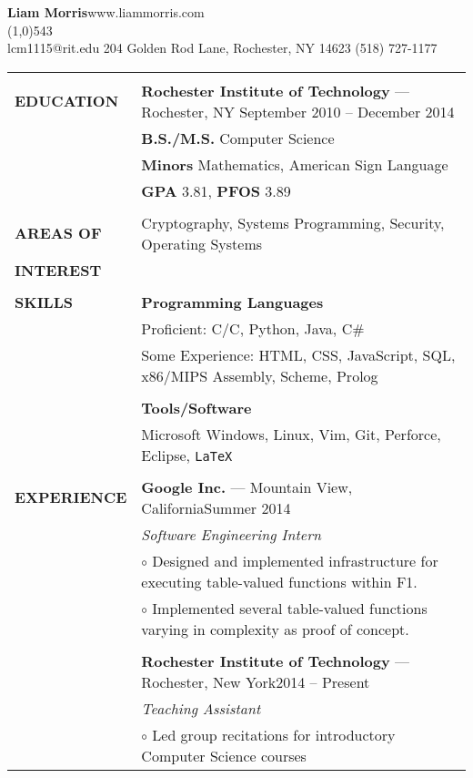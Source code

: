 \documentclass[10pt,letterpaper]{article}
\newcommand{\CPP}{C\nolinebreak[4]\hspace{-.05em}\raisebox{.22ex}{\footnotesize\bf ++}}
\newcommand{\circbullet}{\hspace{10pt}$\circ$ }
\begin{document}
\raggedright

\textbf{\huge{Liam Morris}}\hfill www.liammorris.com\\
\vspace{-8pt}
\line(1,0){543}\\
lcm1115@rit.edu \hfill 204 Golden Rod Lane, Rochester, NY 14623 \hfill (518) 727-1177\\
\vspace{5pt}

\begin{tabular}{@{}lp{6.6in}}
&\\
\textbf{EDUCATION}
&\textbf{Rochester Institute of Technology} --- Rochester, NY \hfill September 2010 -- December 2014\\
&\textbf{B.S./M.S.} Computer Science\\
&\textbf{Minors} Mathematics, American Sign Language\\
&\textbf{GPA} 3.81, \textbf{PFOS} 3.89\\
&\\
\textbf{AREAS OF}
&Cryptography, Systems Programming, Security, Operating Systems\\
\textbf{INTEREST}&\\
&\\
\textbf{SKILLS}
&\textbf{Programming Languages}\\
&Proficient: C/\CPP, Python, Java, C\#\\
&Some Experience: HTML, CSS, JavaScript, SQL, x86/MIPS Assembly, Scheme, Prolog\\
&\\
&\textbf{Tools/Software}\\
&Microsoft Windows, Linux, Vim, Git, Perforce, Eclipse, \texttt{\LaTeX}\\
&\\
\textbf{EXPERIENCE}
&\textbf{Google Inc.} --- Mountain View, California\hfill Summer 2014\\
&\emph{Software Engineering Intern}\\
&\circbullet Designed and implemented infrastructure for executing table-valued functions within F1.\\
&\circbullet Implemented several table-valued functions varying in complexity as proof of concept.\\
&\\
&\textbf{Rochester Institute of Technology} --- Rochester, New York\hfill 2014 -- Present\\
&\emph{Teaching Assistant}\\
&\circbullet Led group recitations for introductory Computer Science courses\\

\end{tabular}
\end{document}
